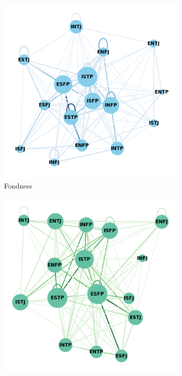 \begin{figure}[!h]
    \centering
    \begin{subfigure}[b]{0.22\textwidth} 
        \centering
        \includegraphics[width=\linewidth, scale=0.7]{images/fondness.png} 
        \caption{Fondness}
        \label{fig:subgraph1}
    \end{subfigure}
    \hfill
    \begin{subfigure}[b]{0.22\textwidth} 
        \centering
        \includegraphics[width=\linewidth, scale=0.7]{images/dislike.png}

\end{subfigure}
\end{figure}
